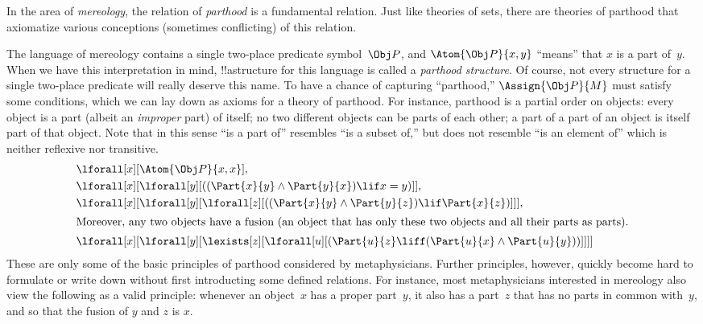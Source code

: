 \documentclass[../../include/open-logic-section]{subfiles}
\begin{document}
\begin{ex}
In the area of \emph{mereology}, the relation of \emph{parthood} is a
fundamental relation.  Just like theories of sets, there are theories
of parthood that axiomatize various conceptions (sometimes
conflicting) of this relation.

The language of mereology contains a single two-place predicate
symbol~$\Obj P$, and $\Atom{\Obj P}{x, y}$ ``means'' that $x$ is a
part of~$y$.  When we have this interpretation in mind, !!a{structure}
for this language is called a \emph{parthood structure}.  Of course,
not every structure for a single two-place predicate will really
deserve this name.  To have a chance of capturing ``parthood,''
$\Assign{\Obj P}{M}$ must satisfy some conditions, which we can lay
down as axioms for a theory of parthood.  For instance, parthood is a
partial order on objects: every object is a part (albeit an
\emph{improper} part) of itself; no two different objects can be parts
of each other; a part of a part of an object is itself part of that
object.  Note that in this sense ``is a part of'' resembles ``is a
subset of,'' but does not resemble ``is an element of'' which is
neither reflexive nor transitive.
\begin{align*}
& \lforall[x][\Atom{\Obj P}{x,x}], \\
& \lforall[x][\lforall[y][((\Part{x}{y} \land \Part{y}{x})
      \lif x = y)]], \\
& \lforall[x][\lforall[y][\lforall[z][((\Part{x}{y} \land
        \Part{y}{z}) \lif \Part{x}{z})]]],\\
\intertext{Moreover, any two objects have a fusion (an object that has
  only these two objects and all their parts as parts).}  &
\lforall[x][\lforall[y][\lexists[z][\lforall[u][(\Part{u}{z} \liff
        (\Part{u}{x} \land \Part{u}{y}))]]]]
\end{align*}
These are only some of the basic principles of parthood considered by
metaphysicians.  Further principles, however, quickly become hard to
formulate or write down without first introducting some defined
relations.  For instance, most metaphysicians interested in mereology
also view the following as a valid principle: whenever an
object~$x$ has a proper part~$y$, it also has a part~$z$ that has no
parts in common with~$y$, and so that the fusion of $y$ and $z$ is
$x$.
\end{ex}
\end{document}
